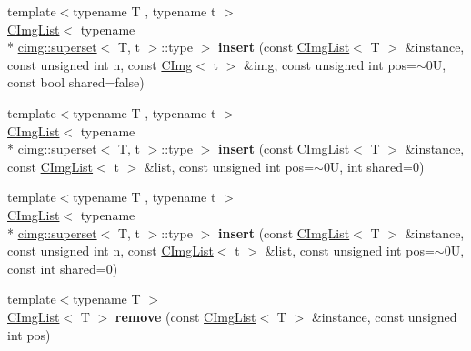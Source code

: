 \begin{DoxyCompactItemize}
\item 
\hypertarget{namespacecimg__library_a75bfd8ba8a54170dda6ea0e17d76d5f8}{{\footnotesize template$<$typename T , typename t $>$ }\\\hyperlink{structcimg__library_1_1_c_img_list}{C\-Img\-List}$<$ typename \\*
\hyperlink{structcimg__library_1_1cimg_1_1superset}{cimg\-::superset}$<$ T, t $>$\-::type $>$ {\bfseries insert} (const \hyperlink{structcimg__library_1_1_c_img_list}{C\-Img\-List}$<$ T $>$ \&instance, const unsigned int n, const \hyperlink{structcimg__library_1_1_c_img}{C\-Img}$<$ t $>$ \&img, const unsigned int pos=$\sim$0\-U, const bool shared=false)}\label{namespacecimg__library_a75bfd8ba8a54170dda6ea0e17d76d5f8}

\item 
\hypertarget{namespacecimg__library_ad94be33a428f0075358b6aa3b41ca199}{{\footnotesize template$<$typename T , typename t $>$ }\\\hyperlink{structcimg__library_1_1_c_img_list}{C\-Img\-List}$<$ typename \\*
\hyperlink{structcimg__library_1_1cimg_1_1superset}{cimg\-::superset}$<$ T, t $>$\-::type $>$ {\bfseries insert} (const \hyperlink{structcimg__library_1_1_c_img_list}{C\-Img\-List}$<$ T $>$ \&instance, const \hyperlink{structcimg__library_1_1_c_img_list}{C\-Img\-List}$<$ t $>$ \&list, const unsigned int pos=$\sim$0\-U, int shared=0)}\label{namespacecimg__library_ad94be33a428f0075358b6aa3b41ca199}

\item 
\hypertarget{namespacecimg__library_a00a5c0ffdf74f8e422359bb4b061cea1}{{\footnotesize template$<$typename T , typename t $>$ }\\\hyperlink{structcimg__library_1_1_c_img_list}{C\-Img\-List}$<$ typename \\*
\hyperlink{structcimg__library_1_1cimg_1_1superset}{cimg\-::superset}$<$ T, t $>$\-::type $>$ {\bfseries insert} (const \hyperlink{structcimg__library_1_1_c_img_list}{C\-Img\-List}$<$ T $>$ \&instance, const unsigned int n, const \hyperlink{structcimg__library_1_1_c_img_list}{C\-Img\-List}$<$ t $>$ \&list, const unsigned int pos=$\sim$0\-U, const int shared=0)}\label{namespacecimg__library_a00a5c0ffdf74f8e422359bb4b061cea1}

\item 
\hypertarget{namespacecimg__library_af31b22a7a085b93b0886e44dd74d7e3e}{{\footnotesize template$<$typename T $>$ }\\\hyperlink{structcimg__library_1_1_c_img_list}{C\-Img\-List}$<$ T $>$ {\bfseries remove} (const \hyperlink{structcimg__library_1_1_c_img_list}{C\-Img\-List}$<$ T $>$ \&instance, const unsigned int pos)}\label{namespacecimg__library_af31b22a7a085b93b0886e44dd74d7e3e}


\end{DoxyCompactItemize}
